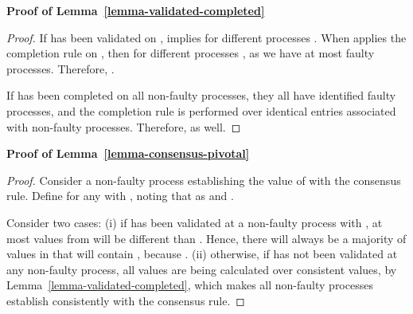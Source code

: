 \documentclass[11pt]{article}
\begin{document}
\noindent \textbf{Proof of Lemma~\ref{lemma-validated-completed}}
\begin{proof}
If  has been validated on ,
 implies  for  different processes .
When  applies the completion rule on ,
then  for  different processes ,
as we have at most  faulty processes.
Therefore,
.

If  has been completed on all non-faulty processes,
they all have identified  faulty processes,
and the completion rule is performed over identical entries associated with non-faulty processes.
Therefore,
 as well.
\end{proof}

\noindent \textbf{Proof of Lemma~\ref{lemma-consensus-pivotal}}
\begin{proof}
Consider a non-faulty process  establishing the value of 
with the consensus rule.
Define  for any  with ,
noting that  as  and .

Consider two cases:
(i) if  has been validated at a non-faulty process  with ,
at most  values from 
will be different than .
Hence, there will always be a majority of values in  that will contain ,
because .
(ii) otherwise, if  has not been validated at any non-faulty process,
all  values are being calculated over consistent values,
by Lemma~\ref{lemma-validated-completed},
which makes all non-faulty processes establish  consistently with the consensus rule.
\end{proof}

\begin{comment}
\noindent \textbf{Proof of Lemma~\ref{lemma-decision-pivotal}}
\begin{proof}
By Lemma~\ref{lemma-consensus-pivotal},
every process  from  will have an associated value 
resulting from the consensus rule,
and this value is consistent across non-faulty processes that decide based on .
If ,
 must be 's input ,
as  is necessarily validated.
Since we have at most  faulty processes and ,
more than  values are inputs of non-faulty processes,
and since we have at most  input values,
one value must appear  times.
Therefore,
our decision function is well-defined.

Since non-faulty processes that decide on 
decide consistently on a multiset of consistent values,
the decision is identical across those processes.
Also,
any value appearing at least  times must have been input
by a non-faulty process,
as we have at most  faulty processes.
\end{proof}
\end{comment}



\end{document}
